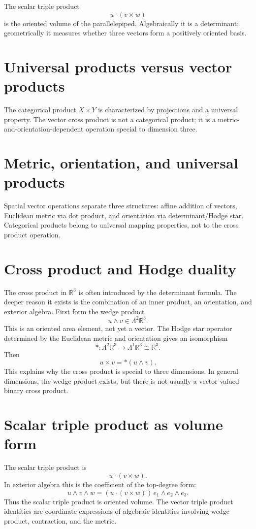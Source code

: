The scalar triple product
\[
  u\cdot(v\times w)
\]
is the oriented volume of the parallelepiped.  Algebraically it is a determinant; geometrically it measures whether three vectors form a positively oriented basis.

\section{Universal products versus vector products}

The categorical product \(X\times Y\) is characterized by projections and a universal property.  The vector cross product is not a categorical product; it is a metric-and-orientation-dependent operation special to dimension three.

\section{Metric, orientation, and universal products}

Spatial vector operations separate three structures: affine addition of vectors, Euclidean metric via dot product, and orientation via determinant/Hodge star.  Categorical products belong to universal mapping properties, not to the cross product operation.

\section{Cross product and Hodge duality}

The cross product in $\mathbb R^3$ is often introduced by the determinant formula.  The deeper reason it exists is the combination of an inner product, an orientation, and exterior algebra.  First form the wedge product
\[
  u\wedge v\in \Lambda^2 \mathbb R^3.
\]
This is an oriented area element, not yet a vector.  The Hodge star operator determined by the Euclidean metric and orientation gives an isomorphism
\[
  *:\Lambda^2\mathbb R^3\to\Lambda^1\mathbb R^3\cong \mathbb R^3.
\]
Then
\[
  u\times v=*(u\wedge v).
\]
This explains why the cross product is special to three dimensions.  In general dimensions, the wedge product exists, but there is not usually a vector-valued binary cross product.

\section{Scalar triple product as volume form}

The scalar triple product is
\[
  u\cdot(v\times w).
\]
In exterior algebra this is the coefficient of the top-degree form:
\[
  u\wedge v\wedge w=(u\cdot(v\times w))\,e_1\wedge e_2\wedge e_3.
\]
Thus the scalar triple product is oriented volume.  The vector triple product identities are coordinate expressions of algebraic identities involving wedge product, contraction, and the metric.

